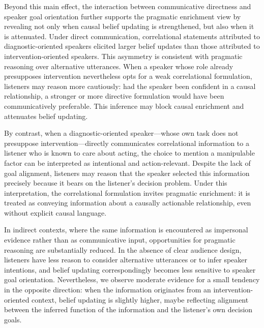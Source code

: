 \documentclass[10pt,letterpaper]{article}
\begin{document}
Beyond this main effect, the interaction between communicative directness and speaker goal orientation further supports the pragmatic enrichment view by revealing not only when causal belief updating is strengthened, but also when it is attenuated.
Under direct communication, correlational statements attributed to diagnostic-oriented speakers elicited larger belief updates than those attributed to intervention-oriented speakers. This asymmetry is consistent with pragmatic reasoning over alternative utterances. When a speaker whose role already presupposes intervention nevertheless opts for a weak correlational formulation, listeners may reason more cautiously: had the speaker been confident in a causal relationship, a stronger or more directive formulation would have been communicatively preferable. This inference may block causal enrichment and attenuates belief updating.

By contrast, when a diagnostic-oriented speaker—whose own task does not presuppose intervention—directly communicates correlational information to a listener who is known to care about acting, the choice to mention a manipulable factor can be interpreted as intentional and action-relevant. Despite the lack of goal alignment, listeners may reason that the speaker selected this information precisely because it bears on the listener’s decision problem. Under this interpretation, the correlational formulation invites pragmatic enrichment: it is treated as conveying information about a causally actionable relationship, even without explicit causal language.

In indirect contexts, where the same information is encountered as impersonal evidence rather than as communicative input, opportunities for pragmatic reasoning are substantially reduced. In the absence of clear audience design, listeners have less reason to consider alternative utterances or to infer speaker intentions, and belief updating correspondingly becomes less sensitive to speaker goal orientation. Nevertheless, we observe moderate evidence for a small tendency in the opposite direction: when the information originates from an intervention-oriented context, belief updating is slightly higher, maybe reflecting alignment between the inferred function of the information and the listener’s own decision goals.
\end{document}
